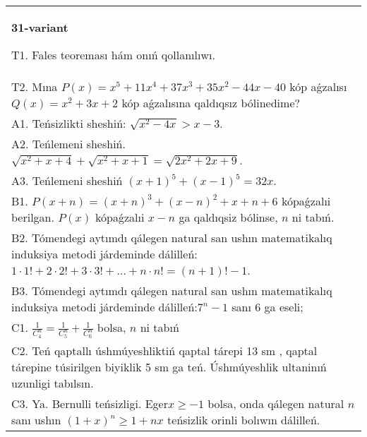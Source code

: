 \documentclass{article}
\begin{document}
\begin{tabular}{m{17cm}}
\textbf{31-variant}
\newline

T1. Fales teoreması hám onıń qollanılıwı. \\
T2. Mına \(P(x) = x^{5} + 11x^{4} + 37x^{3} + 35x^{2} - 44x - 40\) kóp aǵzalısı \(Q(x) = x^{2} + 3x + 2\) kóp aǵzalısına qaldıqsız bólinedime? \\
A1. Teńsizlikti sheshiń: \(\sqrt{x^{2} - 4x} > x - 3\). \\
A2. Teńlemeni sheshiń. \(\sqrt{x^{2} + x + 4} + \sqrt{x^{2} + x + 1} = \sqrt{2x^{2} + 2x + 9}\). \\
A3. Teńlemeni sheshiń \((x + 1)^{5} + (x - 1)^{5} = 32x\). \\
B1. \(P(x + n) = (x + n)^{3} + (x - n)^{2} + x + n + 6\) kópaǵzalıi berilgan. \(P(x)\) kópaǵzalıi \(x - n\) ga qaldıqsiz bólinse, \(n\) ni tabıń. \\
B2. Tómendegi aytımdı qálegen natural san ushın matematikalıq induksiya metodi járdeminde dálilleń: \(1 \cdot 1! + 2 \cdot 2! + 3 \cdot 3! + \ldots + n \cdot n! = (n + 1)! - 1\). \\
B3. Tómendegi aytımdı qálegen natural san ushın matematikalıq induksiya metodi járdeminde dálilleń:\(7^{n} - 1\) sanı 6 ga eseli; \\
C1. \(\frac{1}{C_{4}^{n}} = \frac{1}{C_{5}^{n}} + \frac{1}{C_{6}^{n}}\) bolsa, \(n\) ni tabıń \\
C2. Teń qaptallı úshmúyeshliktiń qaptal tárepi 13 sm , qaptal tárepine túsirilgen biyiklik 5 sm ga teń. Úshmúyeshlik ultaninıń uzunligi tabılsın. \\
C3. Ya. Bernulli teńsizligi. Eger\(x \geq - 1\) bolsa, onda qálegen natural \(n\) sanı ushın \((1 + x)^{n} \geq 1 + nx\) teńsizlik orinli bolıwın dálilleń. \\

\end{tabular}
\vspace{1cm}
\end{document}
